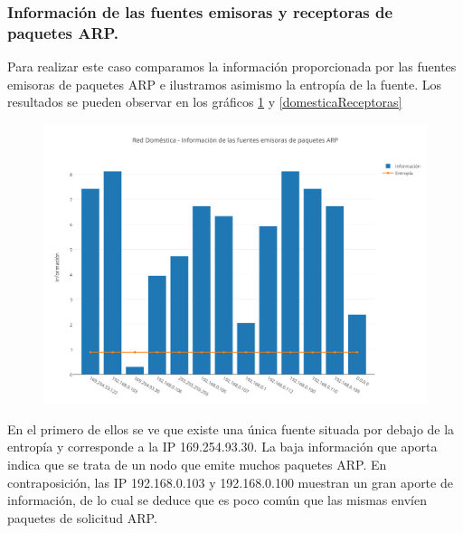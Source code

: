 \subsubsection{Informaci\'on de las fuentes emisoras y receptoras de paquetes ARP.}

Para realizar este caso comparamos la informaci\'on proporcionada por las fuentes emisoras de paquetes ARP e ilustramos asimismo la entrop\'ia de la fuente. Los resultados se pueden observar en los gr\'aficos \ref{domesticaEmisoras} y \ref{domesticaReceptoras}

\begin{figure}[h!]
    \centering                                                       
    \includegraphics[width=400pt]{img/RedDomesticaFuentesEmisorasARP}
    \caption{}
    \label{domesticaEmisoras}
\end{figure}

En el primero de ellos se ve que existe una \'unica fuente situada por debajo de la entrop\'ia y corresponde a la IP 169.254.93.30. La baja informaci\'on que aporta indica que se trata de un nodo que emite muchos paquetes ARP. En contraposici\'on, las IP 192.168.0.103 y 192.168.0.100 muestran un gran aporte de informaci\'on, de lo cual se deduce que es poco com\'un que las mismas env\'ien paquetes de solicitud ARP.


